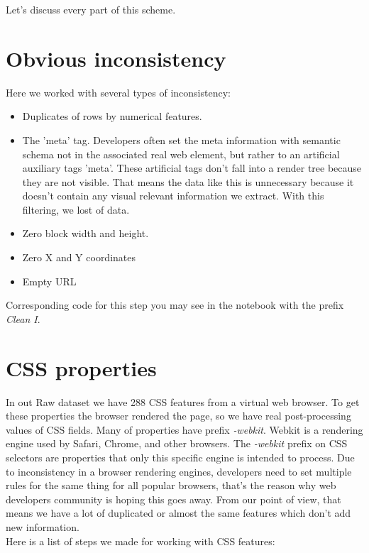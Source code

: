 Let's discuss every part of this scheme.\\

\section*{Obvious inconsistency}

Here we worked with several types of inconsistency:

\begin{itemize}
    \item Duplicates of rows by numerical features.
    \item The 'meta' tag. Developers often set the meta information with semantic schema not in the associated real web element, but rather to an artificial auxiliary tags 'meta'. These artificial tags don't fall into a render tree because they are not visible. That means the data like this is unnecessary because it doesn't contain any visual relevant information we extract. With this filtering, we lost of data.  
    \item Zero block width and height.
    \item Zero X and Y coordinates
    \item Empty URL
\end{itemize}

Corresponding code for this step you may see in the notebook with the prefix \textit{Clean I}.


\section*{CSS properties}
In out Raw dataset we have 288 CSS features from a virtual web browser. To get these properties the browser rendered the page, so we have real post-processing values of CSS fields. Many of properties have prefix \textit{-webkit}. Webkit is a rendering engine used by Safari, Chrome, and other browsers. The \textit{-webkit} prefix on CSS selectors are properties that only this specific engine is intended to process. Due to inconsistency in a browser rendering engines, developers need to set multiple rules for the same thing for all popular browsers, that's the reason why web developers community is hoping this goes away. From our point of view, that means we have a lot of duplicated or almost the same features which don't add new information.\\

Here is a list of steps we made for working with CSS features:

